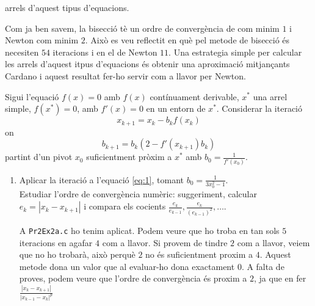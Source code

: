 \documentclass[a4paper, 12pt]{article}
\begin{document}
\begin{exercici}
\begin{enumerate}[label=\alph*)]
            arrels d'aquest tipus d'equacions.\\
            \begin{solucio}
                Com ja ben savem, la bisecció tè un ordre de convergència de com minim $1$ i Newton
                com minim $2$. Això es veu reflectit en què pel metode de bisecció és necesiten $54$
                iteracions i en el de Newton $11$. Una estrategia simple per calcular les arrels
                d'aquest itpus d'equacions és obtenir una aproximació mitjançants Cardano i aquest
                resultat fer-ho servir com a llavor per Newton. 
            \end{solucio}
        \end{enumerate}
    \end{exercici}
    \newpage
    \begin{exercici}
        Sigui l'equació $f\left(x\right) = 0$ amb $f\left(x\right)$ contínuament derivable, $x^*$
        una arrel simple, $f\left(x^*\right) = 0$, amb $f'\left(x\right) = 0$ en un entorn de $x^*$.
        Considerar la iteració
        \begin{displaymath}
            x_{k+1} = x_k - b_kf\left(x_k\right) 
        \end{displaymath}
        on
        \begin{displaymath}
            b_{k+1} = b_k\left(2-f'\left(x_{k+1}\right)b_k\right)
        \end{displaymath}
        partint d'un pivot $x_0$ suficientment pròxim a $x^*$ amb $b_0 = \frac{1}{f'\left(x_0\right) }$.
        \begin{enumerate}[label=\alph*)]
            \item Aplicar la iteració a l'equació \eqref{eq:1}, tomant $b_0 = \frac{1}{3x^2_0-1}$.\\
            Estudiar l'ordre de convergència numèric: suggeriment, calcular $e_k = \left\lvert x_k-x_{k+1}\right\rvert$
            i compara els cocients $\frac{e_k}{e_{k-1}}, \frac{e_k}{\left(e_{k-1}\right)^2}, \dots$.\\
            \begin{solucio}
                A \verb|Pr2Ex2a.c| ho tenim aplicat. Podem veure que ho troba en tan sols $5$
                iteracions en agafar $4$ com a llavor. Si provem de tindre $2$ com a llavor, veiem
                que no ho trobarà, això perquè $2$ no és suficientment proxim a $4$. Aquest metode
                dona un valor que al evaluar-ho dona exactament $0$. A falta de proves, podem
                veure que l'ordre de convergència és proxim a $2$, ja que en fer $\frac{\left\lvert x_k-x_{k+1}\right\rvert }{\left\lvert x_{k-1}-x_k\right\rvert ^p}$

\end{solucio}
\end{enumerate}
\end{exercici}
\end{document}
